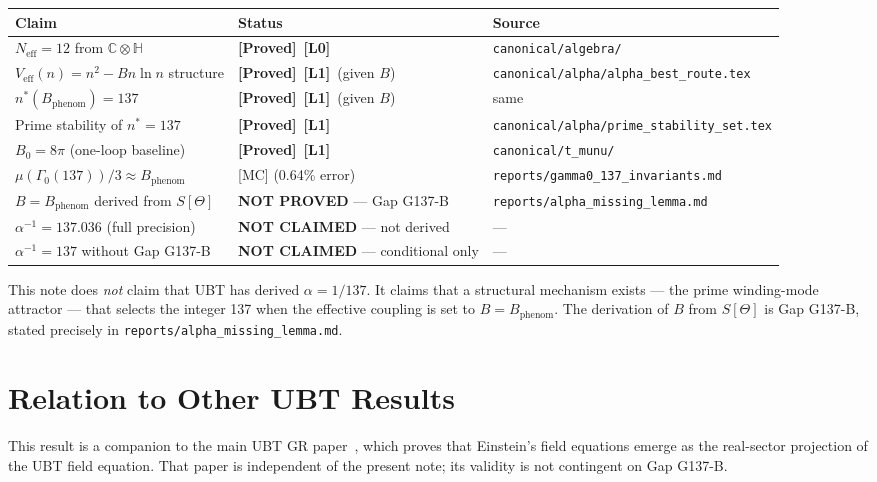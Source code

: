 \documentclass[12pt,a4paper]{article}
\theoremstyle{definition}
\theoremstyle{remark}
\newcommand{\PROVED}{\textbf{[Proved]}}
\newcommand{\Lzero}{\textbf{[L0]}}
\newcommand{\Lone}{\textbf{[L1]}}
\newcommand{\CC}{\mathbb{C}}
\newcommand{\HH}{\mathbb{H}}
\begin{document}
\begin{center}
\begin{tabular}{lll}
\toprule
\textbf{Claim} & \textbf{Status} & \textbf{Source} \\
\midrule
$N_{\mathrm{eff}} = 12$ from $\CC\otimes\HH$ & \PROVED\ \Lzero &
  \texttt{canonical/algebra/} \\
$V_{\mathrm{eff}}(n) = n^2 - Bn\ln n$ structure & \PROVED\ \Lone\ (given $B$) &
  \texttt{canonical/alpha/alpha\_best\_route.tex} \\
$n^*(B_{\mathrm{phenom}}) = 137$ & \PROVED\ \Lone\ (given $B$) &
  same \\
Prime stability of $n^* = 137$ & \PROVED\ \Lone &
  \texttt{canonical/alpha/prime\_stability\_set.tex} \\
$B_0 = 8\pi$ (one-loop baseline) & \PROVED\ \Lone &
  \texttt{canonical/t\_munu/} \\
$\mu(\Gamma_0(137))/3 \approx B_{\mathrm{phenom}}$ & [MC] (0.64\% error) &
  \texttt{reports/gamma0\_137\_invariants.md} \\
\midrule
$B = B_{\mathrm{phenom}}$ derived from $S[\Theta]$ & \textbf{NOT PROVED} — Gap G137-B &
  \texttt{reports/alpha\_missing\_lemma.md} \\
$\alpha^{-1} = 137.036$ (full precision) & \textbf{NOT CLAIMED} — not derived &
  — \\
$\alpha^{-1} = 137$ without Gap G137-B & \textbf{NOT CLAIMED} — conditional only &
  — \\
\bottomrule
\end{tabular}
\end{center}

This note does \emph{not} claim that UBT has derived $\alpha = 1/137$.
It claims that a structural mechanism exists — the prime winding-mode
attractor — that selects the integer 137 when the effective coupling is
set to $B = B_{\mathrm{phenom}}$.  The derivation of $B$ from $S[\Theta]$
is Gap G137-B, stated precisely in \texttt{reports/alpha\_missing\_lemma.md}.

\section{Relation to Other UBT Results}
\label{sec:relation}

This result is a companion to the main UBT GR paper~\cite{jaros2026_gr},
which proves that Einstein's field equations emerge as the real-sector
projection of the UBT field equation.  That paper is independent of the
present note; its validity is not contingent on Gap G137-B.
\end{document}
